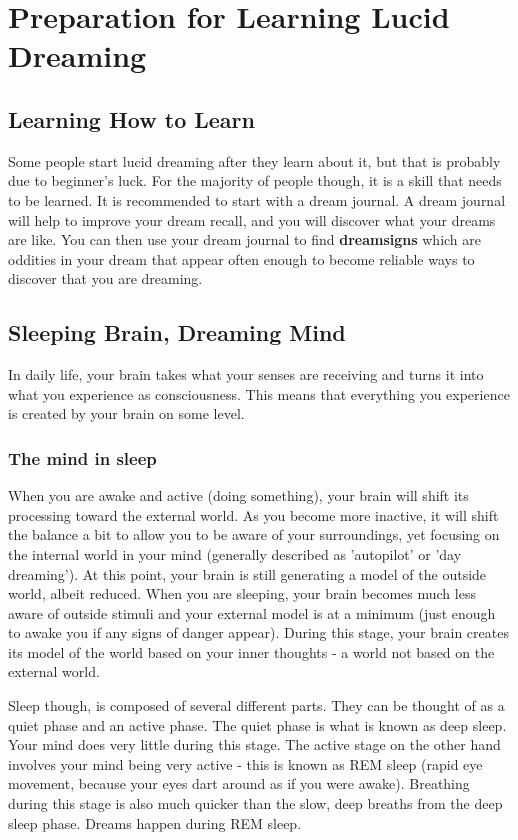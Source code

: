 \documentclass{report}
\begin{document}
\chapter{Preparation for Learning Lucid Dreaming}
\section{Learning How to Learn}
Some people start lucid dreaming after they learn about it, but that is probably due to beginner's luck. For the majority of people though, it is a skill that needs to be learned. It is recommended to start with a dream journal. A dream journal will help to improve your dream recall, and you will discover what your dreams are like. You can then use your dream journal to find \textbf{dreamsigns} which are oddities in your dream that appear often enough to become reliable ways to discover that you are dreaming.

\section{Sleeping Brain, Dreaming Mind}
In daily life, your brain takes what your senses are receiving and turns it into what you experience as consciousness. This means that everything you experience is created by your brain on some level.

\subsection{The mind in sleep}
When you are awake and active (doing something), your brain will shift its processing toward the external world. As you become more inactive, it will shift the balance a bit to allow you to be aware of your surroundings, yet focusing on the internal world in your mind (generally described as 'autopilot' or 'day dreaming'). At this point, your brain is still generating a model of the outside world, albeit reduced. When you are sleeping, your brain becomes much less aware of outside stimuli and your external model is at a minimum (just enough to awake you if any signs of danger appear). During this stage, your brain creates its model of the world based on your inner thoughts - a world not based on the external world.

Sleep though, is composed of several different parts. They can be thought of as a quiet phase and an active phase. The quiet phase is what is known as deep sleep. Your mind does very little during this stage. The active stage on the other hand involves your mind being very active - this is known as REM sleep (rapid eye movement, because your eyes dart around as if you were awake). Breathing during this stage is also much quicker than the slow, deep breaths from the deep sleep phase. Dreams happen during REM sleep.
\end{document}
